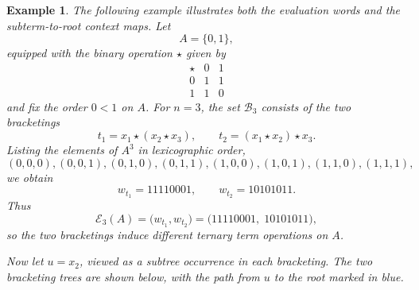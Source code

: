 \documentclass[11pt]{article}
\newtheorem{example}[theorem]{Example}
\begin{document}
\begin{example}
The following example illustrates both the evaluation words and the
subterm-to-root context maps. Let
\[
A=\{0,1\},
\]
equipped with the binary operation \(\star\) given by
\[
\begin{array}{c|cc}
\star & 0 & 1\\ \hline
0 & 1 & 1\\
1 & 1 & 0
\end{array}
\]
and fix the order \(0<1\) on \(A\).
For \(n=3\), the set \(\mathcal B_3\) consists of the two bracketings
\[
t_1=x_1\star(x_2\star x_3),
\qquad
t_2=(x_1\star x_2)\star x_3.
\]
Listing the elements of \(A^3\) in lexicographic order,
\[
(0,0,0),(0,0,1),(0,1,0),(0,1,1),
(1,0,0),(1,0,1),(1,1,0),(1,1,1),
\]
we obtain
\[
w_{t_1}=11110001,
\qquad
w_{t_2}=10101011.
\]
Thus
\[
\mathcal E_3(A)=\bigl(w_{t_1},w_{t_2}\bigr)
=\bigl(11110001,\;10101011\bigr),
\]
so the two bracketings induce different ternary term operations on \(A\).
\newpage

Now let \(u=x_2\), viewed as a subtree occurrence in each bracketing. The two
bracketing trees are shown below, with the path from \(u\) to the root marked in
blue.

\begin{center}
\end{center}
\end{example}
\end{document}
